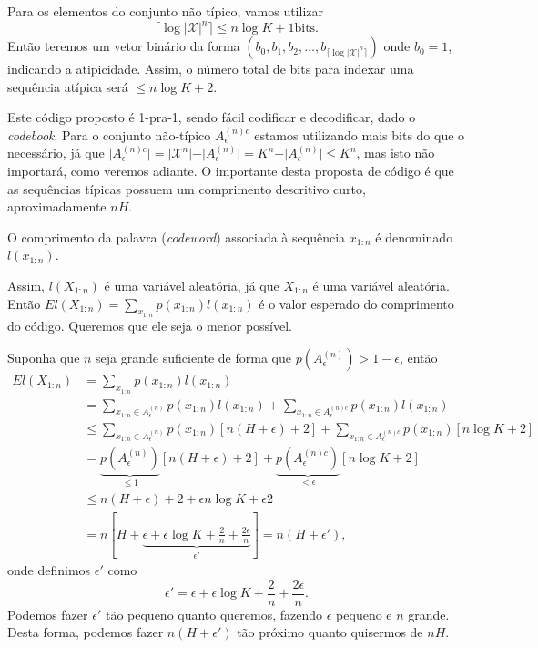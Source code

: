 Para os elementos do conjunto não típico, vamos utilizar
\begin{equation}
  \lceil \log \vert \mathcal{X} \vert^n \rceil \leq n \log K + 1 \text{bits}.
\end{equation}
Então teremos um vetor binário da forma $(b_0,b_1,b_2,\ldots,b_{\lceil \log \vert \mathcal{X} \vert^n \rceil})$
onde $b_0=1$, indicando a atipicidade.
Assim, o número total de bits para indexar uma sequência atípica será $\leq n \log K + 2$.

Este código proposto é 1-pra-1, sendo fácil codificar e decodificar, dado o \textit{codebook}.
Para o conjunto não-típico $A_\epsilon^{(n)c}$ estamos utilizando mais bits do que o necessário,
já que $\vert A_\epsilon^{(n)c} \vert = \vert \mathcal{X}^n \vert - \vert A_\epsilon^{(n)} \vert = K^n - \vert A_\epsilon^{(n)} \vert \leq K^n$,
mas isto não importará, como veremos adiante.
O importante desta proposta de código é que as sequências típicas possuem um comprimento descritivo curto, aproximadamente $nH$.

\begin{definition}
  O comprimento da palavra (\emph{codeword}) associada à sequência $x_{1:n}$ é denominado $l(x_{1:n})$.
\end{definition}
Assim, $l(X_{1:n})$ é uma variável aleatória, já que $X_{1:n}$ é uma variável aleatória.
Então $E l(X_{1:n}) = \sum_{x_{1:n}} p(x_{1:n}) l(x_{1:n})$ é o valor esperado do comprimento
do código. Queremos que ele seja o menor possível.

Suponha que $n$ seja grande suficiente de forma que $p(A_\epsilon^{(n)}) > 1 - \epsilon$, então
\begin{subequations}
  \begin{align}
    E l(X_{1:n}) &= \sum_{x_{1:n}} p(x_{1:n}) l(x_{1:n}) \\
                 &= \sum_{x_{1:n} \in A_\epsilon^{(n)}} p(x_{1:n}) l(x_{1:n}) + \sum_{x_{1:n} \in A_\epsilon^{(n)c}} p(x_{1:n}) l(x_{1:n}) \\
                 &\leq \sum_{x_{1:n} \in A_\epsilon^{(n)}} p(x_{1:n}) [n(H+\epsilon)+2] + \sum_{x_{1:n} \in A_\epsilon^{(n)c}} p(x_{1:n}) [n \log K + 2] \\
                 &= \underbrace{p(A_\epsilon^{(n)})}_{\leq 1} [n(H+\epsilon)+2] + \underbrace{p(A_\epsilon^{(n)c})}_{< \epsilon} [n \log K + 2] \\
                 &\leq n(H+\epsilon)+2 + \epsilon n \log K + \epsilon 2 \\
                 &= n [H + \underbrace{\epsilon + \epsilon \log K + \frac{2}{n} + \frac{2 \epsilon}{n}}_{\epsilon'} ] = n(H+\epsilon') ,
  \end{align}
\end{subequations}
onde definimos $\epsilon'$ como
\begin{equation}
  \epsilon' = \epsilon + \epsilon \log K + \frac{2}{n} + \frac{2 \epsilon}{n} .
\end{equation}
Podemos fazer $\epsilon'$ tão pequeno quanto queremos, fazendo $\epsilon$ pequeno e $n$ grande.
Desta forma, podemos fazer $n(H+\epsilon')$ tão próximo quanto quisermos de $nH$.

